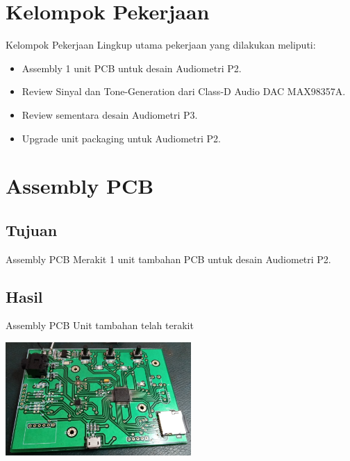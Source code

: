 \documentclass[table,dvipsnames]{beamer}
\begin{document}
	\section{Kelompok Pekerjaan}
	\begin{frame}
	    \begin{exampleblock}{Kelompok Pekerjaan}
			Lingkup utama pekerjaan yang dilakukan meliputi:
			\begin{itemize}
				\item Assembly 1 unit PCB untuk desain Audiometri P2.
				\item Review Sinyal dan Tone-Generation dari Class-D Audio DAC MAX98357A.
				\item Review sementara desain Audiometri P3.
				\item Upgrade unit packaging untuk Audiometri P2.
			\end{itemize}
	    \end{exampleblock}
	\end{frame}

	\section{Assembly PCB}
	\begin{frame}
		\subsection{Tujuan}
		\begin{exampleblock}{Assembly PCB}
			Merakit 1 unit tambahan PCB untuk desain Audiometri P2.
		\end{exampleblock}

		\subsection{Hasil}
		\begin{exampleblock}{Assembly PCB}
			Unit tambahan telah terakit
			\begin{center}
				\includegraphics[width=200pt]{images/assembly_hasil}
			\end{center}
		\end{exampleblock}
	\end{frame}
\end{document}
